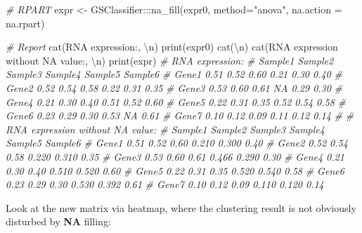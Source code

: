 \documentclass[
  12pt,
]{book}
\newenvironment{Shaded}{\begin{snugshade}}{\end{snugshade}}
\newcommand{\AttributeTok}[1]{\textcolor[rgb]{0.77,0.63,0.00}{#1}}
\newcommand{\CommentTok}[1]{\textcolor[rgb]{0.56,0.35,0.01}{\textit{#1}}}
\newcommand{\FunctionTok}[1]{\textcolor[rgb]{0.00,0.00,0.00}{#1}}
\newcommand{\NormalTok}[1]{#1}
\newcommand{\OtherTok}[1]{\textcolor[rgb]{0.56,0.35,0.01}{#1}}
\newcommand{\SpecialCharTok}[1]{\textcolor[rgb]{0.00,0.00,0.00}{#1}}
\newcommand{\StringTok}[1]{\textcolor[rgb]{0.31,0.60,0.02}{#1}}
\begin{document}
\begin{Shaded}
\begin{Highlighting}[]
\CommentTok{\# RPART}
\NormalTok{expr }\OtherTok{\textless{}{-}}\NormalTok{ GSClassifier}\SpecialCharTok{:::}\FunctionTok{na\_fill}\NormalTok{(expr0, }\AttributeTok{method=}\StringTok{"anova"}\NormalTok{, }\AttributeTok{na.action =}\NormalTok{ na.rpart)}

\CommentTok{\# Report}
\FunctionTok{cat}\NormalTok{(}\StringTok{\textquotesingle{}RNA expression:\textquotesingle{}}\NormalTok{, }\StringTok{\textquotesingle{}}\SpecialCharTok{\textbackslash{}n}\StringTok{\textquotesingle{}}\NormalTok{)}
\FunctionTok{print}\NormalTok{(expr0)}
\FunctionTok{cat}\NormalTok{(}\StringTok{\textquotesingle{}}\SpecialCharTok{\textbackslash{}n}\StringTok{\textquotesingle{}}\NormalTok{)}
\FunctionTok{cat}\NormalTok{(}\StringTok{\textquotesingle{}RNA expression without NA value:\textquotesingle{}}\NormalTok{, }\StringTok{\textquotesingle{}}\SpecialCharTok{\textbackslash{}n}\StringTok{\textquotesingle{}}\NormalTok{)}
\FunctionTok{print}\NormalTok{(expr)}
\CommentTok{\# RNA expression: }
\CommentTok{\#       Sample1 Sample2 Sample3 Sample4 Sample5 Sample6}
\CommentTok{\# Gene1    0.51    0.52    0.60    0.21    0.30    0.40}
\CommentTok{\# Gene2    0.52    0.54    0.58    0.22    0.31    0.35}
\CommentTok{\# Gene3    0.53    0.60    0.61      NA    0.29    0.30}
\CommentTok{\# Gene4    0.21    0.30    0.40    0.51    0.52    0.60}
\CommentTok{\# Gene5    0.22    0.31    0.35    0.52    0.54    0.58}
\CommentTok{\# Gene6    0.23    0.29    0.30    0.53      NA    0.61}
\CommentTok{\# Gene7    0.10    0.12    0.09    0.11    0.12    0.14}
\CommentTok{\# }
\CommentTok{\# RNA expression without NA value: }
\CommentTok{\#       Sample1 Sample2 Sample3 Sample4 Sample5 Sample6}
\CommentTok{\# Gene1    0.51    0.52    0.60   0.210   0.300    0.40}
\CommentTok{\# Gene2    0.52    0.54    0.58   0.220   0.310    0.35}
\CommentTok{\# Gene3    0.53    0.60    0.61   0.466   0.290    0.30}
\CommentTok{\# Gene4    0.21    0.30    0.40   0.510   0.520    0.60}
\CommentTok{\# Gene5    0.22    0.31    0.35   0.520   0.540    0.58}
\CommentTok{\# Gene6    0.23    0.29    0.30   0.530   0.392    0.61}
\CommentTok{\# Gene7    0.10    0.12    0.09   0.110   0.120    0.14}
\end{Highlighting}
\end{Shaded}

Look at the new matrix via heatmap, where the clustering result is not obviously disturbed by \textbf{NA} filling:
\end{document}
